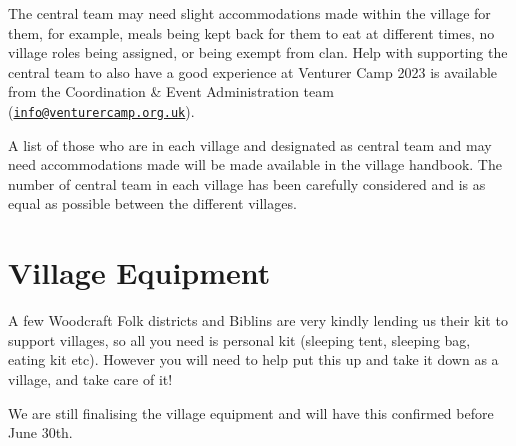 \documentclass[a4paper, 11pt]{report}
\makeatletter
\newcommand{\nl}{\newline}
\newcommand{\infoemail}{\href{mailto:info@venturercamp.org.uk}{\texttt{info@venturercamp.org.uk}}}
\makeatother
\begin{document}
The central team may need slight accommodations made within the village for them, for example, meals being kept back for them to eat at different times, no village roles being assigned, or being exempt from clan. Help with supporting the central team to also have a good experience at Venturer Camp 2023 is available from the Coordination \& Event Administration team (\infoemail).\nl

A list of those who are in each village and designated as central team and may need accommodations made will be made available in the village handbook. The number of central team in each village has been carefully considered and is as equal as possible between the different villages.

\section{Village Equipment}
A few Woodcraft Folk districts and Biblins are very kindly lending us their kit to support villages, so all you need is personal kit (sleeping tent, sleeping bag, eating kit etc). However you will need to help put this up and take it down as a village, and take care of it!\nl

We are still finalising the village equipment and will have this confirmed before June 30th. 
\end{document}
